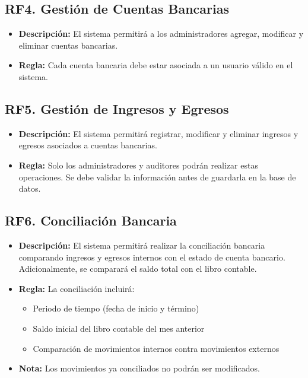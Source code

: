 \documentclass{article}
\begin{document}
\subsection{RF4. Gestión de Cuentas Bancarias}
\begin{itemize}
    \item \textbf{Descripción:} El sistema permitirá a los administradores agregar, modificar y eliminar cuentas bancarias.
    \item \textbf{Regla:} Cada cuenta bancaria debe estar asociada a un usuario válido en el sistema.
\end{itemize}

\subsection{RF5. Gestión de Ingresos y Egresos}
\begin{itemize}
    \item \textbf{Descripción:} El sistema permitirá registrar, modificar y eliminar ingresos y egresos asociados a cuentas bancarias.
    \item \textbf{Regla:} Solo los administradores y auditores podrán realizar estas operaciones. Se debe validar la información antes de guardarla en la base de datos.
\end{itemize}

\subsection{RF6. Conciliación Bancaria}
\begin{itemize}
    \item \textbf{Descripción:} El sistema permitirá realizar la conciliación bancaria comparando ingresos y egresos internos con el estado de cuenta bancario. Adicionalmente, se comparará el saldo total con el libro contable.
    \item \textbf{Regla:} La conciliación incluirá:
    \begin{itemize}
        \item Periodo de tiempo (fecha de inicio y término)
        \item Saldo inicial del libro contable del mes anterior
        \item Comparación de movimientos internos contra movimientos externos
    \end{itemize}
    \item \textbf{Nota:} Los movimientos ya conciliados no podrán ser modificados.
\end{itemize}
\end{document}
